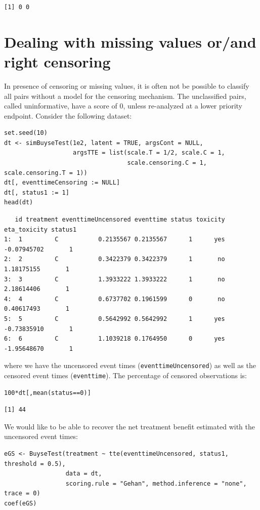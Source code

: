 \documentclass[12pt]{article}
\begin{document}
\begin{verbatim}
[1] 0 0
\end{verbatim}


\clearpage

\section{Dealing with missing values or/and right censoring}
\label{sec:orga8de392}

In presence of censoring or missing values, it is often not be
 possible to classify all pairs without a model for the censoring
 mechanism. The unclassified pairs, called uninformative, have a score
 of 0, unless re-analyzed at a lower priority endpoint. Consider the following
 dataset:
\lstset{language=r,label= ,caption= ,captionpos=b,numbers=none}
\begin{lstlisting}
set.seed(10)
dt <- simBuyseTest(1e2, latent = TRUE, argsCont = NULL,
                   argsTTE = list(scale.T = 1/2, scale.C = 1,
                                  scale.censoring.C = 1, scale.censoring.T = 1))
dt[, eventtimeCensoring := NULL]
dt[, status1 := 1]
head(dt)
\end{lstlisting}

\begin{verbatim}
   id treatment eventtimeUncensored eventtime status toxicity eta_toxicity status1
1:  1         C           0.2135567 0.2135567      1      yes  -0.07945702       1
2:  2         C           0.3422379 0.3422379      1       no   1.18175155       1
3:  3         C           1.3933222 1.3933222      1       no   2.18614406       1
4:  4         C           0.6737702 0.1961599      0       no   0.40617493       1
5:  5         C           0.5642992 0.5642992      1      yes  -0.73835910       1
6:  6         C           1.1039218 0.1764950      0      yes  -1.95648670       1
\end{verbatim}


where we have the uncensored event times (\texttt{eventtimeUncensored}) as well as the censored event
times (\texttt{eventtime}). The percentage of censored observations is:
\lstset{language=r,label= ,caption= ,captionpos=b,numbers=none}
\begin{lstlisting}
100*dt[,mean(status==0)]
\end{lstlisting}

\begin{verbatim}
[1] 44
\end{verbatim}


\noindent We would like to be able to recover the net treatment benefit estimated with the uncensored event times:
\lstset{language=r,label= ,caption= ,captionpos=b,numbers=none}
\begin{lstlisting}
eGS <- BuyseTest(treatment ~ tte(eventtimeUncensored, status1, threshold = 0.5),
                 data = dt,
                 scoring.rule = "Gehan", method.inference = "none", trace = 0)
coef(eGS)
\end{lstlisting}
\end{document}
